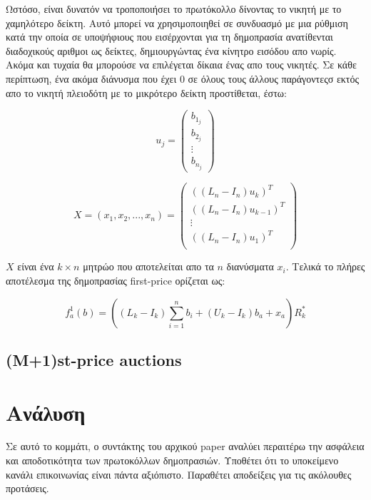 \documentclass[letterpaper,11pt]{article}
\begin{document}
Ωστόσο, είναι δυνατόν να τροποποιήσει το πρωτόκολλο δίνοντας το νικητή με το χαμηλότερο δείκτη. Αυτό μπορεί να χρησιμοποιηθεί σε συνδυασμό με μια
ρύθμιση κατά την οποία σε υποψήφιους που εισέρχονται για τη δημοπρασία ανατίθενται διαδοχικούς αριθμοι ως δείκτες, δημιουργώντας ένα κίνητρο
εισόδου απο νωρίς. Ακόμα και τυχαία θα μπορούσε να επιλέγεται δίκαια ένας απο τους νικητές. Σε κάθε περίπτωση, ένα ακόμα διάνυσμα που έχει 0 σε
όλους τους άλλους παράγοντεςσ εκτός απο το νικητή πλειοδότη με το μικρότερο δείκτη προστίθεται, έστω:

\begin{displaymath}
	u_j =
	\left ( \begin{array}{c}
		b_{1_j} \\
		b_{2_j} \\
		\vdots	\\
		b_{n_j}
	\end{array} \right)	
\end{displaymath}

\begin{displaymath}
	X = (x_1, x_2,..., x_n) =
	\left ( \begin{array}{c}
		((L_n - I_n)u_k)^T \\
		((L_n - I_n)u_{k-1})^T \\
		\vdots \\
		((L_n - I_n)u_1)^T \\
	\end{array} \right)
\end{displaymath}

$X$ είναι ένα $k × n$ μητρώο που αποτελείται απο τα $n$ διανύσματα $x_i$. Τελικά το πλήρες αποτέλεσμα της δημοπρασίας first-price ορίζεται ως:

\begin{displaymath}
	f^1_a(b) = \left ( (L_k - I_k) \sum_{i=1}^{n} b_i + (U_k - I_k) b_a + x_a \right ) R^*_k
\end{displaymath}

\subsection{(M+1)st-price auctions}

\section{Ανάλυση}

Σε αυτό το κομμάτι, ο συντάκτης του αρχικού paper αναλύει περαιτέρω την ασφάλεια και αποδοτικότητα των πρωτοκόλλων δημοπρασιών. Υποθέτει ότι το
υποκείμενο κανάλι επικοινωνίας είναι πάντα αξιόπιστο. Παραθέτει αποδείξεις για τις ακόλουθες προτάσεις.
\end{document}
